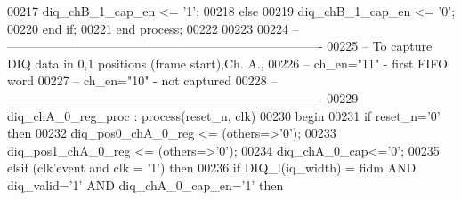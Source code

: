 \begin{DoxyCode}
00217       \textcolor{vhdlchar}{diq_chB_1_cap_en} \textcolor{vhdlchar}{<=} \textcolor{vhdlchar}{'}\textcolor{vhdllogic}{}\textcolor{vhdllogic}{1}\textcolor{vhdlchar}{'};
00218    \textcolor{keywordflow}{else} 
00219       \textcolor{vhdlchar}{diq_chB_1_cap_en} \textcolor{vhdlchar}{<=} \textcolor{vhdlchar}{'}\textcolor{vhdllogic}{}\textcolor{vhdllogic}{0}\textcolor{vhdlchar}{'};
00220    \textcolor{keywordflow}{end} \textcolor{keywordflow}{if};
00221 \textcolor{keywordflow}{end} \textcolor{keywordflow}{process};
00222     
00223     
00224 \textcolor{keyword}{-- ----------------------------------------------------------------------------}
00225 \textcolor{keyword}{-- To capture DIQ data in 0,1 positions (frame start),Ch. A., }
00226 \textcolor{keyword}{-- ch\_en="11" - first FIFO word}
00227 \textcolor{keyword}{-- ch\_en="10" - not captured}
00228 \textcolor{keyword}{-- ----------------------------------------------------------------------------}
00229  diq\_chA\_0\_reg\_proc : \textcolor{keywordflow}{process}(reset_n, clk)
00230 \textcolor{vhdlkeyword}{    begin}
00231       \textcolor{keywordflow}{if} \textcolor{vhdlchar}{reset_n}\textcolor{vhdlchar}{=}\textcolor{vhdlchar}{'}\textcolor{vhdllogic}{}\textcolor{vhdllogic}{0}\textcolor{vhdlchar}{'} \textcolor{keywordflow}{then}
00232          \textcolor{vhdlchar}{diq_pos0_chA_0_reg} \textcolor{vhdlchar}{<=} \textcolor{vhdlchar}{(}\textcolor{keywordflow}{others}\textcolor{vhdlchar}{=}\textcolor{vhdlchar}{>}\textcolor{vhdlchar}{'}\textcolor{vhdllogic}{}\textcolor{vhdllogic}{0}\textcolor{vhdlchar}{'}\textcolor{vhdlchar}{)};
00233          \textcolor{vhdlchar}{diq_pos1_chA_0_reg} \textcolor{vhdlchar}{<=} \textcolor{vhdlchar}{(}\textcolor{keywordflow}{others}\textcolor{vhdlchar}{=}\textcolor{vhdlchar}{>}\textcolor{vhdlchar}{'}\textcolor{vhdllogic}{}\textcolor{vhdllogic}{0}\textcolor{vhdlchar}{'}\textcolor{vhdlchar}{)};
00234          \textcolor{vhdlchar}{diq_chA_0_cap}\textcolor{vhdlchar}{<=}\textcolor{vhdlchar}{'}\textcolor{vhdllogic}{}\textcolor{vhdllogic}{0}\textcolor{vhdlchar}{'};
00235       \textcolor{keywordflow}{elsif} \textcolor{vhdlchar}{(}\textcolor{vhdlchar}{clk}\textcolor{vhdlchar}{'}\textcolor{vhdlkeyword}{event} \textcolor{keywordflow}{and} \textcolor{vhdlchar}{clk} \textcolor{vhdlchar}{=} \textcolor{vhdlchar}{'}\textcolor{vhdllogic}{}\textcolor{vhdllogic}{1}\textcolor{vhdlchar}{'}\textcolor{vhdlchar}{)} \textcolor{keywordflow}{then}
00236             \textcolor{keywordflow}{if} \textcolor{vhdlchar}{DIQ_l}\textcolor{vhdlchar}{(}\textcolor{vhdlchar}{iq_width}\textcolor{vhdlchar}{)} \textcolor{vhdlchar}{=} \textcolor{vhdlchar}{fidm} \textcolor{keywordflow}{AND} \textcolor{vhdlchar}{diq_valid}\textcolor{vhdlchar}{=}\textcolor{vhdlchar}{'}\textcolor{vhdllogic}{}\textcolor{vhdllogic}{1}\textcolor{vhdlchar}{'} \textcolor{keywordflow}{AND} \textcolor{vhdlchar}{diq_chA_0_cap_en}\textcolor{vhdlchar}{=}\textcolor{vhdlchar}{'}\textcolor{vhdllogic}{}\textcolor{vhdllogic}{1}\textcolor{vhdlchar}{'} \textcolor{keywordflow}{then} 

\end{DoxyCode}

